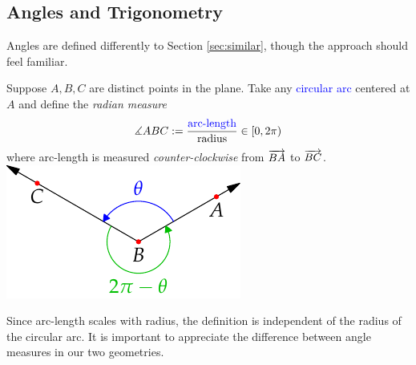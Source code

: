 \clearpage


\subsection{Angles and Trigonometry}\label{sec:analyticangle}

Angles are defined differently to Section \ref{sec:similar}, though the approach should feel familiar. %

\begin{defn}[lower separated=false, sidebyside, sidebyside align=top seam, sidebyside gap=0pt, righthand width=0.32\linewidth]{}{}
	Suppose $A,B,C$ are distinct points in the plane. Take any \textcolor{blue}{circular arc} centered at $A$ and define the \emph{radian measure}
	\[
		\measuredangle ABC:=\frac{\text{\textcolor{blue}{arc-length}}}{\text{radius}} \in[0,2\pi)
	\]
	where arc-length is measured \emph{counter-clockwise} from $\overrightarrow{BA}$ to $\overrightarrow{BC}$.
	\tcblower
	\flushright
	\includegraphics[scale=0.95]{angles-example}
\end{defn}

Since arc-length scales with radius, the definition is independent of the radius of the circular arc. It is important to appreciate the difference between angle measures in our two geometries.\vspace{-5pt}

